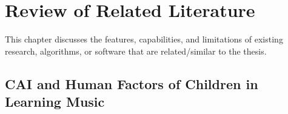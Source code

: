 %
%
%                 

\chapter{Review of Related Literature}
This chapter discusses the features, capabilities, and limitations of existing research, algorithms, or software 
that are related/similar to the thesis.




\begin{comment}
%
%
Guide on Writing your RRL chapter
 
1. Identify the keywords with respect to your research
      One keyword = One document section
                Examples: 2.1 Story Generation Systems
			 2.2 Knowledge Representation

2.  Find references using these keywords

3.  For each of the references that you find,
        Check: Is it relevant to your research?
        Use their references to find more relevant works.

4. Identify a set of criteria for comparison.
       It will serve as a guide to help you focus on what to look for

5. Write a summary focusing on -
       What: A short description of the work
       How: A summary of the approach it utilized
       Findings: If applicable, provide the results
        Why: Relevance to your work

6. At the end of each section,  show a Table of Comparison of the related works 
   and your proposed project/system

\end{comment}

\section{CAI and Human Factors of Children in Learning Music}

